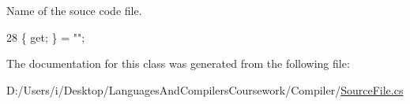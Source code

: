 Name of the souce code file. 
\begin{DoxyCode}
28 \{ \textcolor{keyword}{get}; \} = \textcolor{stringliteral}{""};
\end{DoxyCode}


The documentation for this class was generated from the following file\+:\begin{DoxyCompactItemize}
\item 
D\+:/\+Users/i/\+Desktop/\+Languages\+And\+Compilers\+Coursework/\+Compiler/\mbox{\hyperlink{_source_file_8cs}{Source\+File.\+cs}}\end{DoxyCompactItemize}
